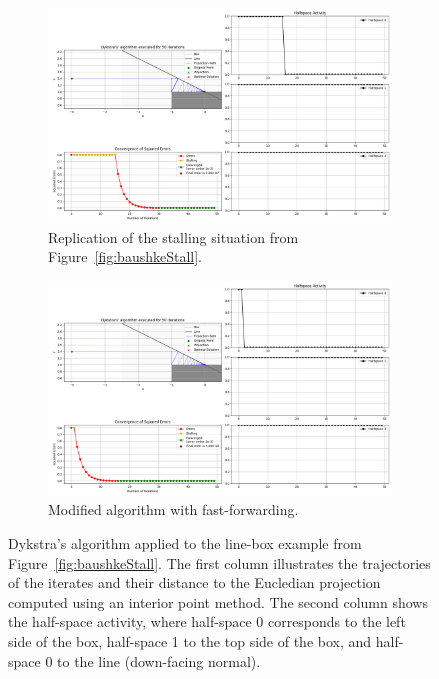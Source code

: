 \documentclass[hidelinks]{article}
\begin{document}
\begin{figure}[h]
    \centering
    \begin{subfigure}[t]{\textwidth}
        \centering
        \includegraphics[width=1\textwidth]{stalling_notfixed_situation_2.png}
        \caption{Replication of the stalling situation from Figure~\ref{fig:baushkeStall}.}
        \label{fig:stalling2}
    \end{subfigure}
    \begin{subfigure}[t]{\textwidth}
        \centering
        \includegraphics[width=1\textwidth]{stalling_fixed_situation_2.png}
        \caption{Modified algorithm with fast-forwarding.}
        \label{fig:fastforwarding}
    \end{subfigure}
    \caption{Dykstra's algorithm applied to the line-box example from Figure~\ref{fig:baushkeStall}. The first column illustrates the trajectories of the iterates and their distance to the Eucledian projection computed using an interior point method. The second column shows the half-space activity, where half-space 0 corresponds to the left side of the box, half-space 1 to the top side of the box, and half-space 0 to the line (down-facing normal).}
    \label{fig:stallingfixed}
\end{figure}
\end{document}
